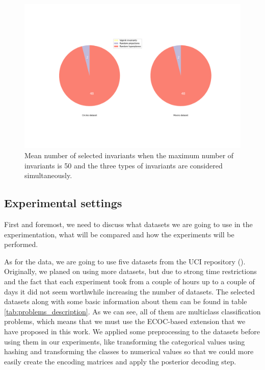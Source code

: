 \begin{figure}[H]
    \centering
    \includegraphics[width=\textwidth]{thesis/Figures/mean_num_selected.png}
    \caption{Mean number of selected invariants when the maximum number of invariants is 50 and the three types of
    invariants are considered simultaneously.}
    \label{fig:toys_mean_num_selected}
\end{figure}


\subsection{Experimental settings}

First and foremost, we need to discuss what datasets we are going to use in the experimentation, what
will be compared and how the experiments will be performed.

As for the data, we are going to use five datasets from the UCI repository (\cite{UCIRepository}). Originally, we
planed on using more datasets, but due to strong time restrictions and the fact that each experiment took from a couple
of hours up to a couple of days it did not seem worthwhile increasing the number of datasets. The selected datasets
along with some basic information about them can be found in table \ref{tab:problems_description}. As we can see, all
of them are multiclass classification problems, which means that we must use the ECOC-based extension that we have
proposed in this work. We applied some preprocessing to the datasets before using them in our experiments, like
transforming the categorical values using hashing and transforming the classes to numerical values so that we
could more easily create the encoding matrices and apply the posterior decoding step.

